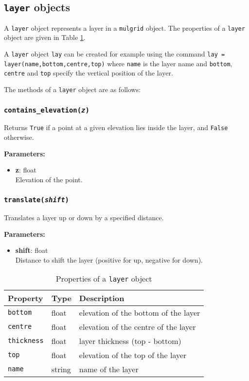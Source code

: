 \subsection{\texttt{layer} objects}

A \texttt{layer} object represents a layer in a \texttt{mulgrid} object. The properties of a \texttt{layer} object are given in Table \ref{tb:layer_properties}.

A \texttt{layer} object \texttt{lay} can be created for example using the command \texttt{lay = layer(name,bottom,centre,top)} where \texttt{name} is the layer name and \texttt{bottom}, \texttt{centre} and \texttt{top} specify the vertical position of the layer.

The methods of a \texttt{layer} object are as follows:

\subsubsection{\texttt{contains\_elevation(\emph{z})}}

Returns \texttt{True} if a point at a given elevation lies inside the layer, and \texttt{False} otherwise.

\textbf{Parameters:}
\begin{itemize}
\item \textbf{z}: float\\
   Elevation of the point.
\end{itemize}

\subsubsection{\texttt{translate(\emph{shift})}}

Translates a layer up or down by a specified distance.

\textbf{Parameters:}
\begin{itemize}
\item \textbf{shift}: float\\
  Distance to shift the layer (positive for up, negative for down).
\end{itemize}

\begin{table}
  \begin{center}
    \begin{tabular}{|l|l|l|}
      \hline
      \textbf{Property} & \textbf{Type} & \textbf{Description}\\
      \hline
      \texttt{bottom} & float & elevation of the bottom of the layer \\
      \texttt{centre} & float & elevation of the centre of the layer \\
      \texttt{thickness} & float & layer thickness (top - bottom) \\
      \texttt{top} & float & elevation of the top of the layer \\
      \texttt{name} & string & name of the layer \\
      \hline
    \end{tabular}
    \caption{Properties of a \texttt{layer} object}
    \label{tb:layer_properties}
  \end{center}
\end{table}

